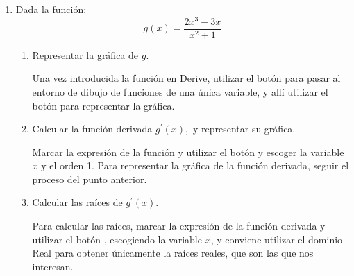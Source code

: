\begin{enumerate}[leftmargin=*]
\begin{indication}
{\begin{enumerate}
\item Para el cálculo de la derivada $n$-ésima, teniendo en cuenta
que en el cuadro de diálogo que aparece al pinchar en el botón
 tan sólo podemos introducir como orden
de la misma un número entero, pero nunca un parámetro como $n$, no
queda otra posibilidad que proceder por inducción, y a la vista de
las primeras derivadas suponer cuál sería el valor de la derivada de
orden $n$. Posteriormente, podemos comprobar que nuestra suposición
es correcta utilizando la fórmula que hemos encontrado para calcular
una derivada de orden bastante alto y comparando con el valor que da
Derive para esa misma derivada.

\end{enumerate}
}
\end{indication}
\item  Dada la función:
\[
g(x)=\dfrac{2x^{3}-3x}{x^{2}+1}
\]

\begin{enumerate}
\item  Representar la gráfica de $g$.

\begin{indication}
{Una vez introducida la función en Derive, utilizar el botón
 para pasar al entorno de dibujo de funciones de
una única variable, y allí utilizar el botón  para representar la gráfica. }
\end{indication}

\item  Calcular la función derivada $g^{\prime }(x),$ y representar su
gráfica.

\begin{indication}
{Marcar la expresión de la función y utilizar el botón  y escoger la variable $x$ y el orden 1. Para
representar la gráfica de la función derivada, seguir el proceso del
punto anterior. }
\end{indication}

\item  Calcular las raíces de $g^{\prime }(x).$

\begin{indication}
{Para calcular las raíces, marcar la expresión de la función
derivada y utilizar el botón , escogiendo
la variable $x$, y conviene utilizar el dominio Real para obtener
únicamente la raíces reales, que son las que nos interesan.

}
\end{indication}


\end{enumerate}
\end{enumerate}
